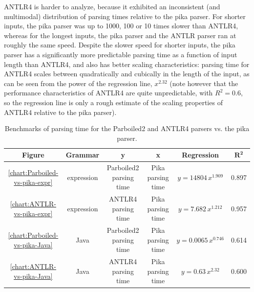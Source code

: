 \documentclass[manuscript,screen]{acmart}
\begin{document}
ANTLR4 is harder to analyze, because it exhibited an inconsistent (and multimodal) distribution of parsing times relative to the pika parser. For shorter inputs, the pika parser was up to 1000, 100 or 10 times slower than ANTLR4, whereas for the longest inputs, the pika parser and the ANTLR parser ran at roughly the same speed. Despite the slower speed for shorter inputs, the pika parser has a significantly more predictable parsing time as a function of input length than ANTLR4, and also has better scaling characteristics: parsing time for ANTLR4 scales between quadratically and cubically in the length of the input, as can be seen from the power of the regression line, $x^{2.32}$ (note however that the performance characteristics of ANTLR4 are quite unpredictable, with $R^2 = 0.6$, so the regression line is only a rough estimate of the scaling properties of ANTLR4 relative to the pika parser).

\begin{table}[htbp]
    \centering
    {\small
    \begin{tabular}{cccccc}\toprule
    
    \textbf{Figure} & \textbf{Grammar} &  \textbf{y} & \textbf{x} & \textbf{Regression} & $\bm{R^2}$\\\midrule

    \ref{chart:Parboiled-vs-pika-expr} & expression & Parboiled2 parsing time & Pika parsing time & $y = 14804 \, x^{1.909}$ & 0.897 \\
    \ref{chart:ANTLR-vs-pika-expr} & expression & ANTLR4 parsing time & Pika parsing time & $y = 7.682 \, x^{1.212}$ & 0.957 \\\midrule

    \ref{chart:Parboiled-vs-pika-Java} & Java & Parboiled2 parsing time & Pika parsing time & $y = 0.0065 \, x^{0.746}$ & 0.614 \\
    \ref{chart:ANTLR-vs-pika-Java} & Java & ANTLR4 parsing time & Pika parsing time & $y = 0.63 \, x^{2.32}$ & 0.600 \\\bottomrule
    \end{tabular}
    }
    \vspace{2mm}
    \caption{\label{tab:Benchmarks-vs-pika}Benchmarks of parsing time for the Parboiled2 and ANTLR4 parsers vs. the pika parser.}
\end{table}
\end{document}

